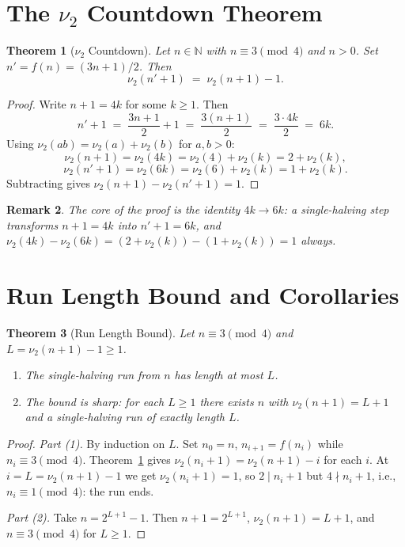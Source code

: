 \documentclass[12pt]{article}
\newtheorem{theorem}{Theorem}[section]
\newtheorem{remark}[theorem]{Remark}
\newcommand{\vp}{\nu_2}
\begin{document}
\section{The $\nu_2$ Countdown Theorem}

\begin{theorem}[$\nu_2$ Countdown]\label{thm:countdown}
Let $n\in\mathbb{N}$ with $n\equiv 3\pmod{4}$ and $n>0$.
Set $n' = f(n) = (3n+1)/2$.  Then
\[
  \vp(n'+1) \;=\; \vp(n+1) - 1.
\]
\end{theorem}

\begin{proof}
Write $n+1 = 4k$ for some $k\geq 1$.  Then
\[
  n'+1 \;=\; \frac{3n+1}{2} + 1 \;=\; \frac{3(n+1)}{2}
         \;=\; \frac{3\cdot 4k}{2} \;=\; 6k.
\]
Using $\vp(ab) = \vp(a)+\vp(b)$ for $a,b>0$:
\[
  \vp(n+1) = \vp(4k) = \vp(4)+\vp(k) = 2+\vp(k),
\]
\[
  \vp(n'+1) = \vp(6k) = \vp(6)+\vp(k) = 1+\vp(k).
\]
Subtracting gives $\vp(n+1)-\vp(n'+1) = 1$.
\end{proof}

\begin{remark}
The core of the proof is the identity $4k \to 6k$: a single-halving step
transforms $n+1 = 4k$ into $n'+1 = 6k$, and $\vp(4k)-\vp(6k) =
(2+\vp(k))-(1+\vp(k)) = 1$ always.
\end{remark}

\section{Run Length Bound and Corollaries}

\begin{theorem}[Run Length Bound]\label{thm:runbound}
Let $n\equiv 3\pmod 4$ and $L = \vp(n+1)-1\geq 1$.
\begin{enumerate}
\item[\textnormal{(1)}] The single-halving run from $n$ has length at most $L$.
\item[\textnormal{(2)}] The bound is sharp: for each $L\geq 1$ there
  exists $n$ with $\vp(n+1)=L+1$ and a single-halving run of exactly
  length $L$.
\end{enumerate}
\end{theorem}

\begin{proof}
\emph{Part (1).}  By induction on $L$.  Set $n_0 = n$,
$n_{i+1} = f(n_i)$ while $n_i\equiv 3\pmod 4$.
Theorem~\ref{thm:countdown} gives $\vp(n_i+1) = \vp(n+1)-i$ for each
$i$.  At $i = L = \vp(n+1)-1$ we get $\vp(n_i+1) = 1$, so
$2\mid n_i+1$ but $4\nmid n_i+1$, i.e., $n_i\equiv 1\pmod 4$: the run
ends.

\emph{Part (2).}  Take $n = 2^{L+1}-1$.  Then $n+1 = 2^{L+1}$,
$\vp(n+1)=L+1$, and $n\equiv 3\pmod 4$ for $L\geq 1$.
\end{proof}
\end{document}
